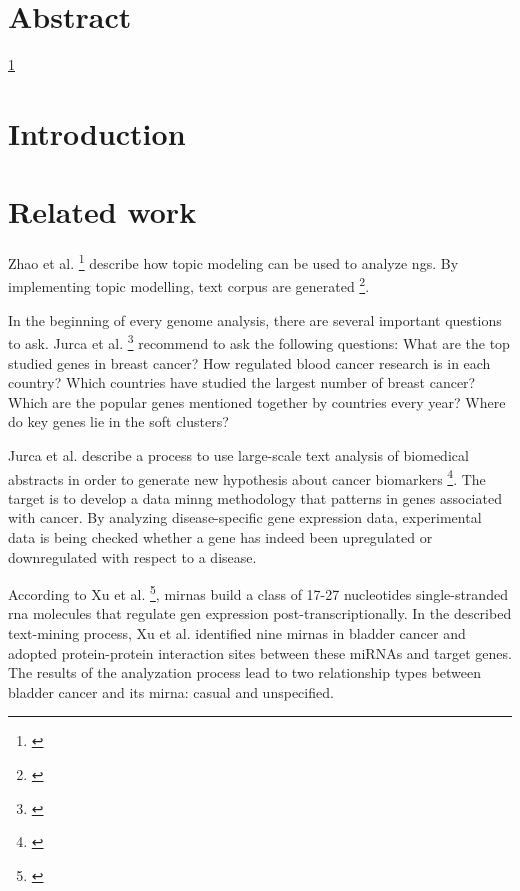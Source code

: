 





\chapter{Abstract}\label{abstract}
\ref{abstract}

\chapter{Introduction}\label{introduction}

\chapter{Related work}\label{related}

Zhao et al. \footnote{\autocite{zhao_2016}} describe how topic modeling can be used to analyze \gls{ngs}. By implementing topic modelling, text corpus are generated \footnote{\autocite{zhao_2016}}.

In the beginning of every genome analysis, there are several important questions to ask. Jurca et al. \footnote{\autocite{jurca_2016}} recommend to ask the following questions: What are the top studied genes in breast cancer? How regulated blood cancer research is in each country? Which countries have studied the largest number of breast cancer? Which are the popular genes mentioned together by countries every year? Where do key genes lie in the soft clusters?

Jurca et al. describe a process to use large-scale text analysis of biomedical abstracts in order to generate new hypothesis about cancer biomarkers \footnote{\autocite{jurca_2016}}. The target is to develop a data minng methodology that patterns in genes associated with cancer. By analyzing disease-specific gene expression data, experimental data is being checked whether a gene has indeed been upregulated or downregulated with respect to a disease.

According to Xu et al. \footnote{\autocite{xu_2013}}, \gls{mirna}s build a class of 17-27 nucleotides single-stranded \gls{rna} molecules that regulate gen expression post-transcriptionally. In the described text-mining process, Xu et al. identified nine \gls{mirna}s in bladder cancer and adopted protein-protein interaction sites between these miRNAs and target genes. The results of the analyzation process lead to two relationship types between bladder cancer and its \gls{mirna}: casual and unspecified. 

